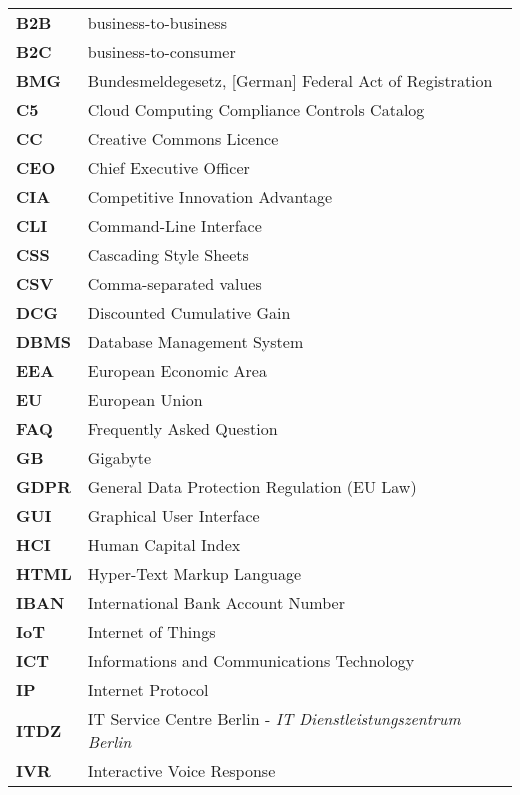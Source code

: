 \begin{flushleft}
\begin{tabular}{ll}
\textbf{B2B}	&	business-to-business\\
\textbf{B2C}	&	business-to-consumer\\
\textbf{BMG}	&	Bundesmeldegesetz, [German] Federal Act of Registration\\

\textbf{ C5} & Cloud Computing Compliance Controls Catalog\\
\textbf{CC}		&	Creative Commons Licence\\
\textbf{CEO}	&	Chief Executive Officer\\
\textbf{CIA}	&	Competitive Innovation Advantage\\
\textbf{CLI}	&	Command-Line Interface\\
\textbf{CSS}	&	Cascading Style Sheets\\
\textbf{CSV}	&	Comma-separated values\\

\textbf{DCG}	&	Discounted Cumulative Gain\\
\textbf{DBMS}	&	Database Management System\\


\textbf{EEA}		&	European Economic Area\\
\textbf{EU}		&	European Union\\


\textbf{FAQ}	&	Frequently Asked Question\\

\textbf{GB}		&	Gigabyte\\
\textbf{GDPR}	&	General Data Protection Regulation (EU Law)\\
\textbf{GUI}	&	Graphical User Interface\\

\textbf{HCI}	&	Human Capital Index\\
\textbf{HTML}	&	Hyper-Text Markup Language\\

\textbf{IBAN}	&	International Bank Account Number\\
\textbf{IoT}	&	Internet of Things\\
\textbf{ICT}	&	Informations and Communications Technology\\
\textbf{IP}	&	Internet Protocol\\

\textbf{ITDZ}	&	IT Service Centre Berlin - \textit{IT Dienstleistungszentrum Berlin}\\

\textbf{IVR}	&	Interactive Voice Response\\


\end{tabular}
\end{flushleft}
